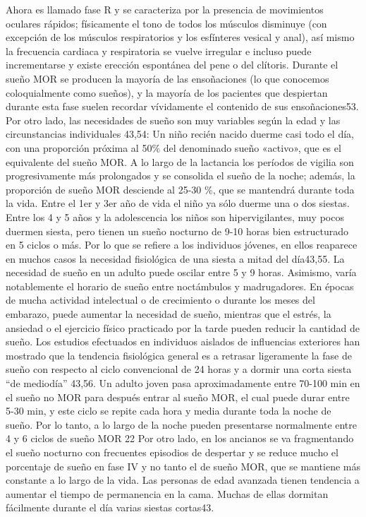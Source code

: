 \documentclass[12pt,a4paper]{mitthesis}
\begin{document}
Ahora es llamado fase R y se caracteriza por la presencia de movimientos oculares rápidos; físicamente el tono de todos los músculos disminuye (con excepción de los músculos respiratorios y los esfínteres vesical y anal), así mismo la frecuencia cardiaca y respiratoria se vuelve irregular e incluso puede incrementarse y existe erección espontánea del pene o del clítoris. Durante el sueño MOR se producen la mayoría de las ensoñaciones (lo que conocemos coloquialmente como sueños), y la mayoría de los pacientes que despiertan durante esta fase suelen recordar vívidamente el contenido de sus ensoñaciones53.
Por otro lado, las necesidades de sueño son muy variables según la edad y las circunstancias individuales 43,54:
Un niño recién nacido duerme casi todo el día, con una proporción próxima al 50\% del denominado sueño «activo», que es el equivalente del sueño MOR. A lo largo de la lactancia los períodos de vigilia son progresivamente más prolongados y se consolida el sueño de la noche; además, la proporción de sueño MOR desciende al 25-30 \%, que se mantendrá durante toda la vida. Entre el 1er y 3er año de vida el niño ya sólo duerme una o dos siestas. Entre los 4 y 5 años y la adolescencia los niños son hipervigilantes, muy pocos duermen siesta, pero tienen un sueño nocturno de 9-10 horas bien estructurado en 5 ciclos o más. Por lo que se refiere a los individuos jóvenes, en ellos reaparece en muchos casos la necesidad fisiológica de una siesta a mitad del día43,55.
La necesidad de sueño en un adulto puede oscilar entre 5 y 9 horas. Asimismo, varía notablemente el horario de sueño entre noctámbulos y madrugadores. En épocas de mucha actividad intelectual o de crecimiento o durante los meses del embarazo, puede aumentar la necesidad de sueño, mientras que el estrés, la ansiedad o el ejercicio físico practicado por la tarde pueden reducir la cantidad de sueño. Los estudios efectuados en individuos aislados de influencias exteriores han mostrado que la tendencia fisiológica general es a retrasar ligeramente la fase de sueño con respecto al ciclo convencional de 24 horas y a dormir una corta siesta “de mediodía” 43,56. Un adulto joven pasa aproximadamente entre 70-100 min en el sueño no MOR para después entrar al sueño MOR, el cual puede durar entre 5-30 min, y este ciclo se repite cada hora y media durante toda la noche de sueño. Por lo tanto, a lo largo de la noche pueden presentarse normalmente entre 4 y 6 ciclos de sueño MOR 22
Por otro lado, en los ancianos se va fragmentando el sueño nocturno con frecuentes episodios de despertar y se reduce mucho el porcentaje de sueño en fase IV y no tanto el de sueño MOR, que se mantiene más constante a lo largo de la vida. Las personas de edad avanzada tienen tendencia a aumentar el tiempo de permanencia en la cama. Muchas de ellas dormitan fácilmente durante el día varias siestas cortas43.
\end{document}
